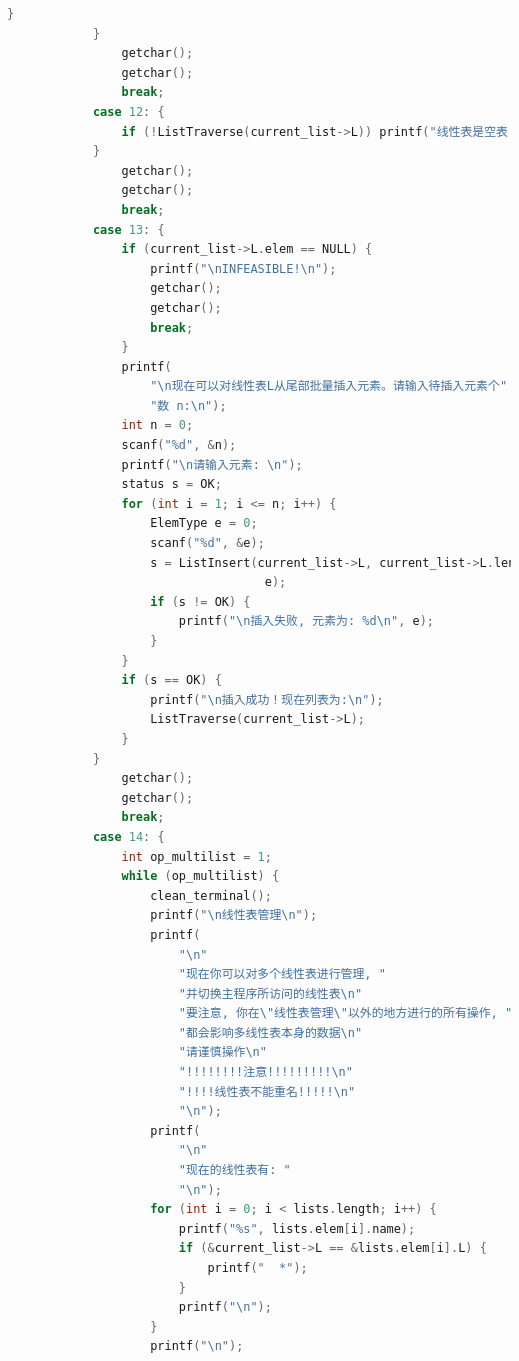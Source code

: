 \documentclass[supercite]{Experimental_Report}
\theoremstyle{definition}
\begin{document}
\begin{lstlisting}[caption={$main.cpp$}, language=C++, frame=single]
				}
			}
				getchar();
				getchar();
				break;
			case 12: {
				if (!ListTraverse(current_list->L)) printf("线性表是空表！\n");
			}
				getchar();
				getchar();
				break;
			case 13: {
				if (current_list->L.elem == NULL) {
					printf("\nINFEASIBLE!\n");
					getchar();
					getchar();
					break;
				}
				printf(
					"\n现在可以对线性表L从尾部批量插入元素。请输入待插入元素个"
					"数 n:\n");
				int n = 0;
				scanf("%d", &n);
				printf("\n请输入元素: \n");
				status s = OK;
				for (int i = 1; i <= n; i++) {
					ElemType e = 0;
					scanf("%d", &e);
					s = ListInsert(current_list->L, current_list->L.length + 1,
									e);
					if (s != OK) {
						printf("\n插入失败, 元素为: %d\n", e);
					}
				}
				if (s == OK) {
					printf("\n插入成功！现在列表为:\n");
					ListTraverse(current_list->L);
				}
			}
				getchar();
				getchar();
				break;
			case 14: {
				int op_multilist = 1;
				while (op_multilist) {
					clean_terminal();
					printf("\n线性表管理\n");
					printf(
						"\n"
						"现在你可以对多个线性表进行管理, "
						"并切换主程序所访问的线性表\n"
						"要注意, 你在\"线性表管理\"以外的地方进行的所有操作, "
						"都会影响多线性表本身的数据\n"
						"请谨慎操作\n"
						"!!!!!!!!注意!!!!!!!!!\n"
						"!!!!线性表不能重名!!!!!\n"
						"\n");
					printf(
						"\n"
						"现在的线性表有: "
						"\n");
					for (int i = 0; i < lists.length; i++) {
						printf("%s", lists.elem[i].name);
						if (&current_list->L == &lists.elem[i].L) {
							printf("  *");
						}
						printf("\n");
					}
					printf("\n");


\end{lstlisting}
\end{document}
